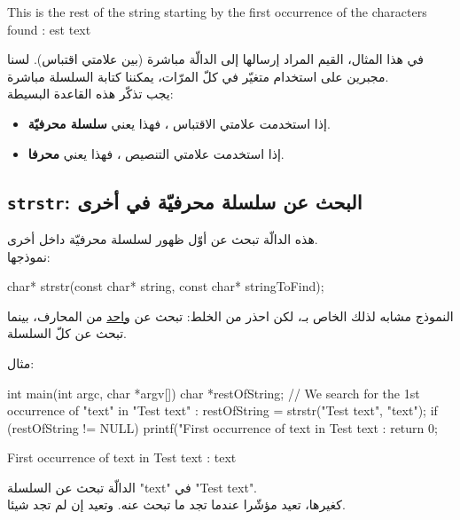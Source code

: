 \begin{Console}
This is the rest of the string starting by the first occurrence of the characters found : est text
\end{Console}

في هذا المثال، القيم المراد إرسالها إلى الدالّة مباشرة (بين علامتي اقتباس). لسنا مجبرين على استخدام متغيّر في كلّ المرّات، يمكننا كتابة السلسلة مباشرة.\\
يجب تذكّر هذه القاعدة البسيطة:

\begin{itemize}
  \item إذا استخدمت علامتي الاقتباس ، فهذا يعني \textbf{سلسلة محرفيّة}.
  \item إذا استخدمت علامتي التنصيص ، فهذا يعني \textbf{محرفا}.
\end{itemize}

\subsection{\texttt{strstr}: البحث عن سلسلة محرفيّة في أخرى}

هذه الدالّة تبحث عن أوّل ظهور لسلسلة محرفيّة داخل أخرى.\\
نموذجها:

\begin{Csource}
char* strstr(const char* string, const char* stringToFind);
\end{Csource}

النموذج مشابه لذلك الخاص بـ،
لكن احذر من الخلط:
تبحث عن
\underline{واحد}
من المحارف، بينما
تبحث عن كلّ السلسلة.

مثال:

\begin{Csource}
int main(int argc, char *argv[])
{
	char *restOfString;
	// We search for the 1st occurrence of "text" in "Test text" :
	restOfString = strstr("Test text", "text");
	if (restOfString != NULL)
	 {
    		printf("First occurrence of text in Test text : %
	}
	return 0;
}
\end{Csource}

\begin{Console}
First occurrence of text in Test text : text
\end{Console}

الدالّة
تبحث عن السلسلة
"\textenglish{text}"
في
"\textenglish{Test text}".\\
كغيرها، تعيد مؤشّرا عندما تجد ما تبحث عنه. وتعيد
إن لم تجد شيئا.

